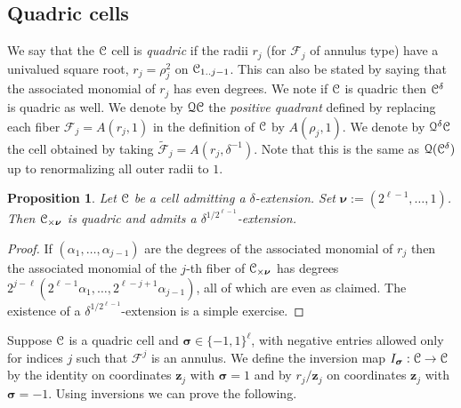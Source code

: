 \documentclass[reqno]{amsart}
\newtheorem{Prop}[Cor]{Proposition}{\bfseries}{\itshape}
\renewcommand\~[1]{\widetilde{#1}}
\def\cF{{\mathcal F}} \def\cL{{\mathcal L}} \def\cR{{\mathcal R}}
\def\vz{{\mathbf z}}
\def\vsigma{{\boldsymbol\sigma}}
\def\vsigma{{\boldsymbol\sigma}}
\def\vnu{{\boldsymbol\nu}}
\def\Qua{\mathcal{Q}}
\begin{document}
\subsection{Quadric cells}

We say that the ${\mathcal C}$ cell is \emph{quadric} if the radii $r_j$ (for
$\cF_j$ of annulus type) have a univalued square root, $r_j=\rho_j^2$
on ${\mathcal C}_{1..j-1}$. This can also be stated by saying that the
associated monomial of $r_j$ has even degrees. We note if ${\mathcal C}$ is
quadric then ${\mathcal C}^\delta$ is quadric as well. We denote by $\Qua\cC$
the \emph{positive quadrant} defined by replacing each fiber
$\cF_j=A(r_j,1)$ in the definition of ${\mathcal C}$ by $A(\rho_j,1)$. We
denote by $\Qua^\delta\cC$ the cell obtained by taking
$\tilde\cF_j=A(r_j,\delta^{-1})$. Note that this is the same as
$\Qua(\cC^\delta)$ up to renormalizing all outer radii to $1$.

\begin{Prop}\label{prop:quadric-nu-cover}
  Let ${\mathcal C}$ be a cell admitting a $\delta$-extension.  Set
  $\vnu:=(2^{\ell-1},\ldots,1)$. Then $\cC_{\times\vnu}$ is quadric
  and admits a $\delta^{1/2^{\ell-1}}$-extension.
\end{Prop}
\begin{proof}
  If $(\alpha_1,\ldots,\alpha_{j-1})$ are the degrees of the
  associated monomial of $r_j$ then the associated monomial of the
  $j$-th fiber of $\cC_{\times\vnu}$ has degrees
  $2^{j-\ell}(2^{\ell-1}\alpha_1,\ldots,2^{\ell-j+1}\alpha_{j-1})$,
  all of which are even as claimed. The existence of a
  $\delta^{1/2^{\ell-1}}$-extension is a simple exercise.
\end{proof}

Suppose ${\mathcal C}$ is a quadric cell and $\vsigma\in\{-1,1\}^\ell$, with
negative entries allowed only for indices $j$ such that $\cF^j$ is an
annulus. We define the inversion map $I_\vsigma:\cC\to\cC$ by the
identity on coordinates $\vz_j$ with $\vsigma=1$ and by $r_j/\vz_j$ on
coordinates $\vz_j$ with $\vsigma=-1$. Using inversions we can prove
the following.
\end{document}
